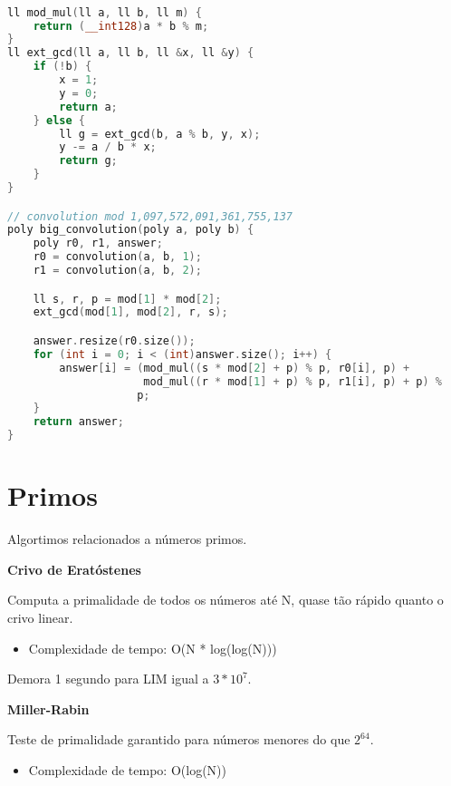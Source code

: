 \documentclass[11pt, a4paper, oneside]{book}
\begin{document}
\begin{multicols}{2}
\begin{lstlisting}[language=C++]

ll mod_mul(ll a, ll b, ll m) {
    return (__int128)a * b % m;
}
ll ext_gcd(ll a, ll b, ll &x, ll &y) {
    if (!b) {
        x = 1;
        y = 0;
        return a;
    } else {
        ll g = ext_gcd(b, a % b, y, x);
        y -= a / b * x;
        return g;
    }
}

// convolution mod 1,097,572,091,361,755,137
poly big_convolution(poly a, poly b) {
    poly r0, r1, answer;
    r0 = convolution(a, b, 1);
    r1 = convolution(a, b, 2);

    ll s, r, p = mod[1] * mod[2];
    ext_gcd(mod[1], mod[2], r, s);

    answer.resize(r0.size());
    for (int i = 0; i < (int)answer.size(); i++) {
        answer[i] = (mod_mul((s * mod[2] + p) % p, r0[i], p) +
                     mod_mul((r * mod[1] + p) % p, r1[i], p) + p) %
                    p;
    }
    return answer;
}
\end{lstlisting}
\end{multicols}

\hfill

\section{Primos}


Algortimos relacionados a números primos.



\textbf{Crivo de Eratóstenes} 

Computa a primalidade de todos os números até N, quase tão rápido quanto o crivo linear.



\begin{itemize}
\item Complexidade de tempo: O(N * log(log(N)))
\end{itemize}



Demora 1 segundo para LIM igual a $3 * 10^7$.



\textbf{Miller-Rabin} 

Teste de primalidade garantido para números menores do que $2^64$.



\begin{itemize}
\item Complexidade de tempo: O(log(N))
\end{itemize}
\end{document}
